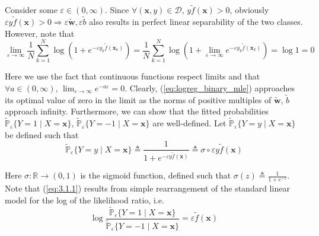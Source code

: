 \documentclass{article}
\numberwithin{equation}{section}
\begin{document}
Consider some $ \varepsilon \in (0, \infty) $. Since
$ \forall (\mathbf{x}, y) \in \mathcal{D} $, $ y\tilde{f}(\mathbf{x}) > 0 $,
obviously $ \varepsilon y\tilde{f}(\mathbf{x}) > 0 \Rightarrow
\varepsilon\tilde{\mathbf{w}}, \varepsilon\tilde{b} $ also results in perfect
linear separability of the two classes. However, note that
\begin{equation*}
    \lim_{\varepsilon \rightarrow \infty}\frac{1}{N}\sum_{k = 1}^N\log\left(
        1 + e^{-\varepsilon y_k\tilde{f}(\mathbf{x}_k)}
    \right) =
    \frac{1}{N}\sum_{k = 1}^N\log\left(
        1 + \lim_{\varepsilon \rightarrow \infty}
        e^{-\varepsilon y_k\tilde{f}(\mathbf{x}_k)}
    \right) =
    \log 1 = 0
\end{equation*}

Here we use the fact that continuous functions respect limits and that
$ \forall a \in (0, \infty) $,
$ \lim_{\varepsilon \rightarrow \infty}e^{-a\varepsilon} = 0 $. Clearly,
(\ref{eq:logreg_binary_mle}) approaches its optimal value of zero in the
limit as the norms of positive multiples of $ \tilde{\mathbf{w}} $,
$ \tilde{b} $ approach infinity. Furthermore, we can show that the fitted
probabilities $ \tilde{\mathbb{P}}_\varepsilon\{Y = 1 \mid X = \mathbf{x}\} $,
$ \tilde{\mathbb{P}}_\varepsilon\{Y = -1 \mid X = \mathbf{x}\} $ are
well-defined. Let $ \tilde{\mathbb{P}}_\varepsilon
\{Y = y \mid X = \mathbf{x}\} $ be defined such that
\begin{equation} \label{eq:3.1.1}
    \tilde{\mathbb{P}}_\varepsilon\{Y = y \mid X = \mathbf{x}\} \triangleq
    \frac{1}{1 + e^{-\varepsilon y\tilde{f}(\mathbf{x})}} \triangleq
    \sigma\circ\varepsilon y\tilde{f}(\mathbf{x})
\end{equation}

Here $ \sigma : \mathbb{R} \rightarrow (0, 1) $ is the sigmoid function,
defined such that $ \sigma(z) \triangleq \frac{1}{1 + e^{-z}} $. Note that
(\ref{eq:3.1.1}) results from simple rearrangement of the standard linear
model for the log of the likelihood ratio, i.e.
\begin{equation*}
    \log\frac{
        \tilde{\mathbb{P}}_\varepsilon\{Y = 1 \mid X = \mathbf{x}\}
    }{
        \tilde{\mathbb{P}}_\varepsilon\{Y = -1 \mid X = \mathbf{x}\}
    } =
    \varepsilon\tilde{f}(\mathbf{x})
\end{equation*}
\end{document}
